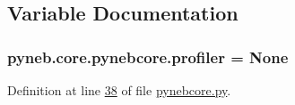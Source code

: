 \subsection{Variable Documentation}
\hypertarget{namespacepyneb_1_1core_1_1pynebcore_ab9e20b2acbbf8eec3da84081929fae24}{}
\subsubsection[{profiler}]{\setlength{\rightskip}{0pt plus 5cm}pyneb.\+core.\+pynebcore.\+profiler = None}\label{namespacepyneb_1_1core_1_1pynebcore_ab9e20b2acbbf8eec3da84081929fae24}


Definition at line \hyperlink{pynebcore_8py_source_l00038}{38} of file \hyperlink{pynebcore_8py_source}{pynebcore.\+py}.

